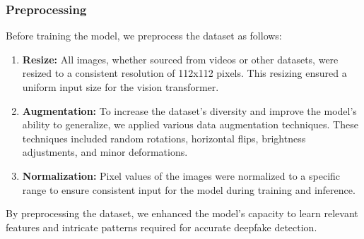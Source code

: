 \subsubsection{Preprocessing}

\noindent Before training the model, we preprocess the dataset as follows:

\begin{enumerate}
    \item \textbf{Resize:} All images, whether sourced from videos or other datasets, were resized to a consistent resolution of 112x112 pixels. This resizing ensured a uniform input size for the vision transformer.

    \item \textbf{Augmentation:} To increase the dataset's diversity and improve the model's ability to generalize, we applied various data augmentation techniques. These techniques included random rotations, horizontal flips, brightness adjustments, and minor deformations.

    \item \textbf{Normalization:} Pixel values of the images were normalized to a specific range to ensure consistent input for the model during training and inference.
\end{enumerate}

\noindent By preprocessing the dataset, we enhanced the model's capacity to learn relevant features and intricate patterns required for accurate deepfake detection.
